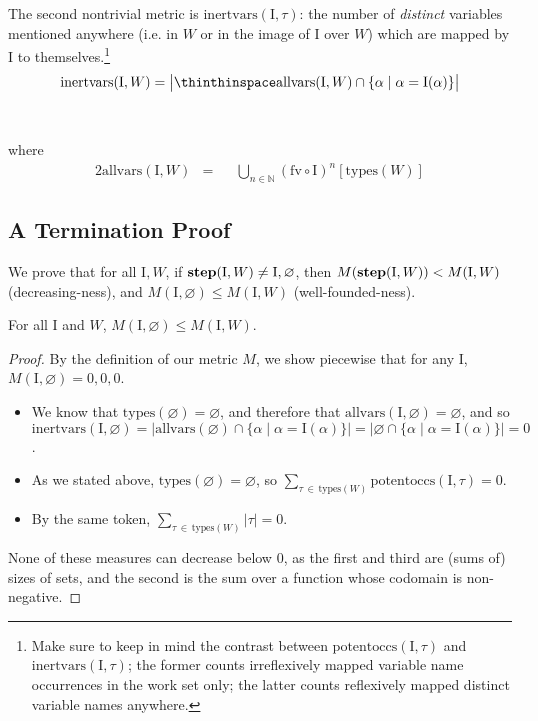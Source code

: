\documentclass[10pt, letterpaper, oneside]{article}
\newcommand{\inertset}{\text{I}}
\newcommand{\fv}{\mathrm{fv}}
\begin{document}
The second nontrivial metric is \(\text{inertvars}(\inertset, \tau)\): the number of \emph{distinct} variables mentioned anywhere (i.e. in \(W\) or in the image of \(\inertset\) over \(W\)) which are mapped by \(\inertset\) to themselves.\footnote{Make sure to keep in mind the contrast between \(\text{potentoccs}(\inertset, \tau)\) and \(\text{inertvars}(\inertset, \tau)\); the former counts irreflexively mapped variable name occurrences in the work set only; the latter counts reflexively mapped distinct variable names anywhere.}
\begin{align*}
  \text{inertvars}(\inertset, W) = \big|\thinthinspace\text{allvars}(\inertset, W) \cap \{\alpha \mid \alpha = \inertset(\alpha)\}\big|
\end{align*}\\\vspace{-2\baselineskip}\\
where\vspace{-.5\baselineskip}
\begin{alignat*}{2}
  \text{allvars}(\inertset, W) &= &&\bigcup_{n \in \mathbb{N}} (\fv \circ \inertset)^n[\text{types}(W)]
\end{alignat*}

\subsection{A Termination Proof}

We prove that for all \(\inertset, W\), if \(\text{\bf step}(\inertset, W) \ne \inertset, \varnothing\), then \(M(\text{\bf step}(\inertset, W)) < M(\inertset, W)\) (decreasing-ness), and \(M(\inertset, \varnothing) \le M(\inertset, W)\) (well-founded-ness).

\begin{theorem}
  \label{theorem:well-founded-step}
  For all  \(\inertset\) and \(W\!\),  \(M(\inertset, \varnothing) \le M(\inertset, W)\).
\end{theorem}

\begin{proof}
  By the definition of our metric \(M\), we show piecewise that for any \(\inertset\),  \(M(\inertset, \varnothing) = 0, 0, 0\).
  \begin{itemize}
    \item We know that \(\text{types}(\varnothing) = \varnothing\), and therefore that \(\text{allvars}(\inertset, \varnothing) = \varnothing\), and so \(\text{inertvars}(\inertset, \varnothing) = |\text{allvars}(\varnothing) \cap \{\alpha \mid \alpha = \inertset(\alpha)\}| = |\varnothing \cap \{\alpha \mid \alpha = \inertset(\alpha)\}| = 0\).
    \item As we stated above, \(\text{types}(\varnothing) = \varnothing\), so \(\sum_{\tau\,\in\,\text{types}(W)}\text{potentoccs}(\inertset, \tau) = 0\).
    \item By the same token, \(\sum_{\tau\,\in\,\text{types}(W)}|\tau| = 0\).
  \end{itemize}
  None of these measures can decrease below 0, as the first and third are (sums of) sizes of sets, and the second is the sum over a function whose codomain is non-negative.
\end{proof}
\end{document}
